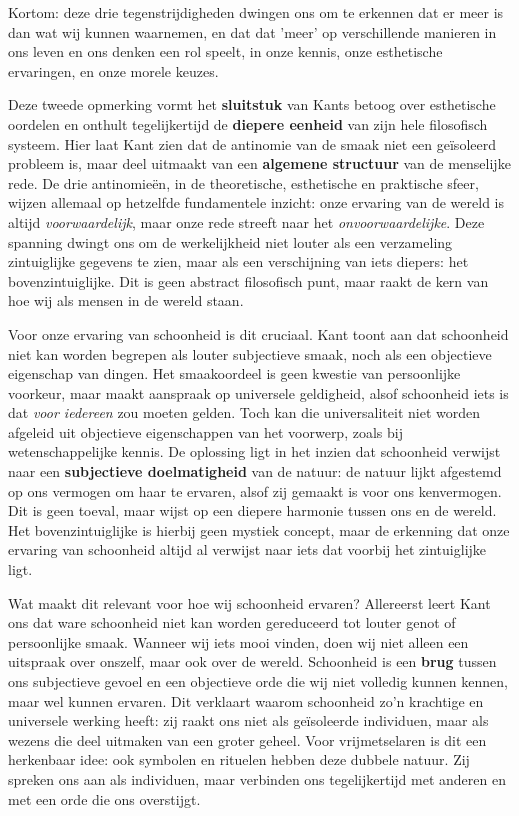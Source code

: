 \begin{mdframed}[leftmargin=0pt,rightmargin=0pt,backgroundcolor=blue!6,linecolor=white,innertopmargin=6pt,innerbottommargin=6pt]
Kortom: deze drie tegenstrijdigheden dwingen ons om te erkennen dat er meer is dan wat wij kunnen waarnemen, en dat dat 'meer' op verschillende manieren in ons leven en ons denken een rol speelt, in onze kennis, onze esthetische ervaringen, en onze morele keuzes.

\bigskip
Deze tweede opmerking vormt het \textbf{sluitstuk} van Kants betoog over esthetische oordelen en onthult tegelijkertijd de \textbf{diepere eenheid} van zijn hele filosofisch systeem. Hier laat Kant zien dat de antinomie van de smaak niet een geïsoleerd probleem is, maar deel uitmaakt van een \textbf{algemene structuur} van de menselijke rede. De drie antinomieën, in de theoretische, esthetische en praktische sfeer, wijzen allemaal op hetzelfde fundamentele inzicht: onze ervaring van de wereld is altijd \textit{voorwaardelijk}, maar onze rede streeft naar het \textit{onvoorwaardelijke}. Deze spanning dwingt ons om de werkelijkheid niet louter als een verzameling zintuiglijke gegevens te zien, maar als een verschijning van iets diepers: het bovenzintuiglijke. Dit is geen abstract filosofisch punt, maar raakt de kern van hoe wij als mensen in de wereld staan.

Voor onze ervaring van schoonheid is dit cruciaal. Kant toont aan dat schoonheid niet kan worden begrepen als louter subjectieve smaak, noch als een objectieve eigenschap van dingen. Het smaakoordeel is geen kwestie van persoonlijke voorkeur, maar maakt aanspraak op universele geldigheid, alsof schoonheid iets is dat \textit{voor iedereen} zou moeten gelden. Toch kan die universaliteit niet worden afgeleid uit objectieve eigenschappen van het voorwerp, zoals bij wetenschappelijke kennis. De oplossing ligt in het inzien dat schoonheid verwijst naar een \textbf{subjectieve doelmatigheid} van de natuur: de natuur lijkt afgestemd op ons vermogen om haar te ervaren, alsof zij gemaakt is voor ons kenvermogen. Dit is geen toeval, maar wijst op een diepere harmonie tussen ons en de wereld. Het bovenzintuiglijke is hierbij geen mystiek concept, maar de erkenning dat onze ervaring van schoonheid altijd al verwijst naar iets dat voorbij het zintuiglijke ligt.

Wat maakt dit relevant voor hoe wij schoonheid ervaren? Allereerst leert Kant ons dat ware schoonheid niet kan worden gereduceerd tot louter genot of persoonlijke smaak. Wanneer wij iets mooi vinden, doen wij niet alleen een uitspraak over onszelf, maar ook over de wereld. Schoonheid is een \textbf{brug} tussen ons subjectieve gevoel en een objectieve orde die wij niet volledig kunnen kennen, maar wel kunnen ervaren. Dit verklaart waarom schoonheid zo’n krachtige en universele werking heeft: zij raakt ons niet als geïsoleerde individuen, maar als wezens die deel uitmaken van een groter geheel. Voor vrijmetselaren is dit een herkenbaar idee: ook symbolen en rituelen hebben deze dubbele natuur. Zij spreken ons aan als individuen, maar verbinden ons tegelijkertijd met anderen en met een orde die ons overstijgt.


\end{mdframed}
